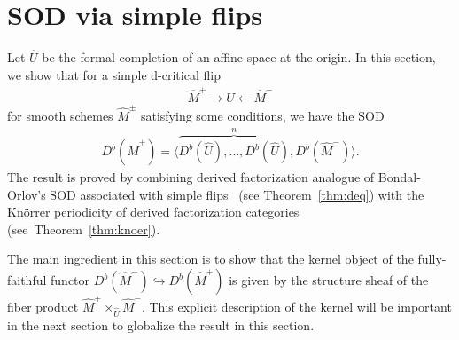 \documentclass[11pt]{amsart}
\theoremstyle{plain}
\begin{document}
\section{SOD via simple flips}\label{sec:sod}
Let $\widehat{U}$ be the formal completion of an affine 
space at the origin.  
In this section, we show that 
for a simple d-critical flip 
\begin{align*}
\widehat{M}^{+} \to \widehat{U} \leftarrow \widehat{M}^{-}
\end{align*}
 for smooth schemes 
$\widehat{M}^{\pm}$
satisfying some conditions, we have 
the SOD
\begin{align}\label{SOD:Mpm:U}
D^b(\widehat{M}^{+})=\langle \overbrace{D^b(\widehat{U}), \ldots, D^b(\widehat{U})}^{n}, D^b(\widehat{M}^{-}) \rangle.
\end{align}
The result is proved by combining derived factorization analogue 
of Bondal-Orlov's SOD associated with simple flips~\cite{B-O2} 
(see Theorem~\ref{thm:deq})
with the {K}n\"orrer periodicity
of derived factorization categories 
(see~Theorem~\ref{thm:knoer}). 

The main ingredient in this section is 
to show that the
kernel object of the fully-faithful functor
$D^b(\widehat{M}^{-}) \hookrightarrow D^b(\widehat{M}^{+})$ 
is given by the structure 
sheaf of the fiber product 
$\widehat{M}^{+} \times_{\widehat{U}} \widehat{M}^{-}$. 
This explicit description of the kernel 
will be important in the next section 
to globalize
the result in this section. 
 
\end{document}
